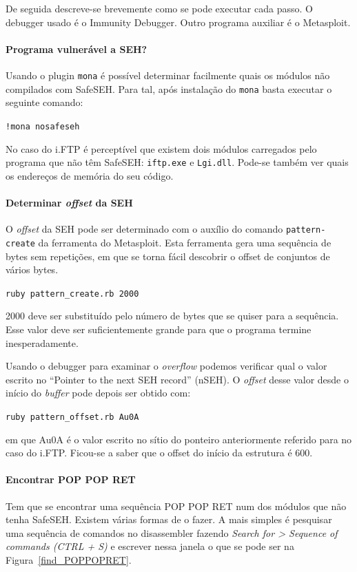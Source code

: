 \documentclass[a4paper]{article}
\begin{document}
De seguida descreve-se brevemente como se pode executar cada passo. O debugger usado é o Immunity Debugger. Outro programa auxiliar é o Metasploit.

\paragraph*{Programa vulnerável a SEH?} Usando o plugin \texttt{mona} é possível determinar facilmente quais os módulos não compilados com SafeSEH. Para tal, após instalação do \texttt{mona} basta executar o seguinte comando:

	\texttt{!mona nosafeseh}

No caso do i.FTP é perceptível que existem dois módulos carregados pelo programa que não têm SafeSEH: \texttt{iftp.exe} e \texttt{Lgi.dll}. Pode-se também ver quais os endereços de memória do seu código.

\paragraph*{Determinar \textit{offset} da SEH} O \textit{offset} da SEH pode ser determinado com o auxílio do comando \texttt{pattern-create} da ferramenta do Metasploit. Esta ferramenta gera uma sequência de bytes sem repetições, em que se torna fácil descobrir o offset de conjuntos de vários bytes.

	\texttt{ruby pattern\_create.rb 2000}

2000 deve ser substituído pelo número de bytes que se quiser para a sequência. Esse valor deve ser suficientemente grande para que o programa termine inesperadamente.

Usando o debugger para examinar o \textit{overflow} podemos verificar qual o valor escrito no ``Pointer to the next SEH record'' (nSEH). O \textit{offset} desse valor desde o início do \textit{buffer} pode depois ser obtido com:

	\texttt{ruby pattern\_offset.rb Au0A}

em que Au0A é o valor escrito no sítio do ponteiro anteriormente referido para no caso do i.FTP. Ficou-se a saber que o offset do início da estrutura é 600.

\paragraph*{Encontrar POP POP RET} Tem que se encontrar uma sequência POP POP RET num dos módulos que não tenha SafeSEH. Existem várias formas de o fazer. A mais simples é pesquisar uma sequência de comandos no disassembler fazendo \textit{Search for > Sequence of commands (CTRL + S)} e escrever nessa janela o que se pode ser na Figura~\ref{find_POPPOPRET}.
\end{document}
